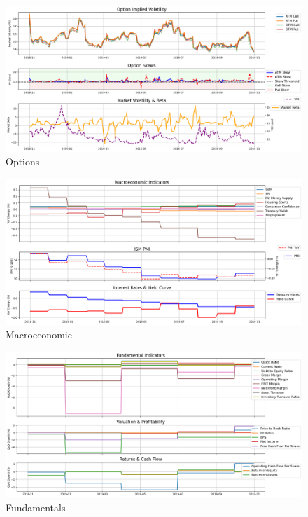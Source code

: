 \documentclass[8pt]{scrartcl}
\begin{document}
\begin{figure}[H]
    \centering
    \includegraphics[width=1\linewidth]{judge_reviews/TSLA_M_gpt-4o-mini/2019-11-01/judge_Option_Implied_Volatility.png}
    \caption{Options}
\end{figure}

\begin{figure}[H]
    \centering
    \includegraphics[width=1\linewidth]{judge_reviews/TSLA_M_gpt-4o-mini/2019-11-01/judge_Macroeconomic_Indicators.png}
    \caption{Macroeconomic}
\end{figure}

\begin{figure}[H]
    \centering
    \includegraphics[width=1\linewidth]{judge_reviews/TSLA_M_gpt-4o-mini/2019-11-01/judge_Fundamental_Indicators.png}
    \caption{Fundamentals}
\end{figure}
\end{document}
